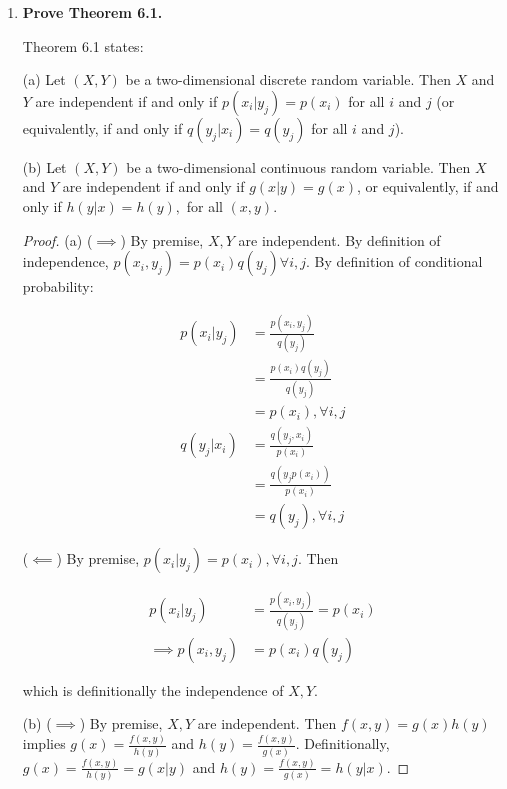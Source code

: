 \documentclass[10pt, oneside]{article}
\begin{document}
\begin{enumerate}[label=6.\arabic*]
As expected, $\sum^8_{i=1} P(W = i) = 0 + 0.02 + 0.06 + 0.13 + 0.19 + 0.24 + 0.19 + 0.12 + 0.05 = \boxed{1}$.

\item  \begin{tcolorbox}[
  colback=Cerulean!5!white,
  colframe=Cerulean!75!black]
\textbf{Prove Theorem 6.1.}
\end{tcolorbox}

Theorem 6.1 states:

(a) Let $(X, Y)$ be a two-dimensional discrete random variable. Then $X$ and $Y$ are independent if and only if $p(x_i | y_j) = p(x_i)$ for all $i$ and $j$ (or equivalently, if and only if $q(y_j | x_i) = q(y_j)$ for all $i$ and $j$).

(b) Let $(X,Y)$ be a two-dimensional continuous random variable. Then $X$ and $Y$ are independent if and only if $g(x | y) = g(x)$, or equivalently, if and only if $h(y | x) = h(y),$ for all $(x,y)$.

\begin{proof}
(a) ($\implies$) By premise, $X, Y$ are independent. By definition of independence, $p(x_i, y_j) = p(x_i) q(y_j) \forall i, j$. By definition of conditional probability:

\begin{align*}
p(x_i | y_j) &= \frac{p(x_i, y_j)}{q(y_j)} \\
&= \frac{p(x_i) q(y_j)}{q(y_j)} \\
&= p(x_i), \forall i, j \\
q(y_j | x_i) &= \frac{q(y_j, x_i)}{p(x_i)} \\
&= \frac{q(y_j p(x_i))}{p(x_i)} \\
&= q(y_j), \forall i, j
\end{align*}

($\impliedby$) By premise, $p(x_i | y_j) = p(x_i), \forall i, j$. Then

\begin{align*}
p(x_i | y_j) &= \frac{p(x_i, y_j)}{q(y_j)} = p(x_i) \\
\implies p(x_i, y_j) &= p(x_i) q(y_j)
\end{align*}

which is definitionally the independence of $X, Y$.

(b) ($\implies$) By premise, $X, Y$ are independent. Then $f(x, y) = g(x) h(y)$ implies $g(x) = \frac{f(x,y)}{h(y)}$ and $h(y) = \frac{f(x,y)}{g(x)}$. Definitionally, $g(x) = \frac{f(x,y)}{h(y)} = g(x | y)$ and $h(y) = \frac{f(x,y)}{g(x)} = h(y | x)$.


\end{proof}
\end{enumerate}
\end{document}
